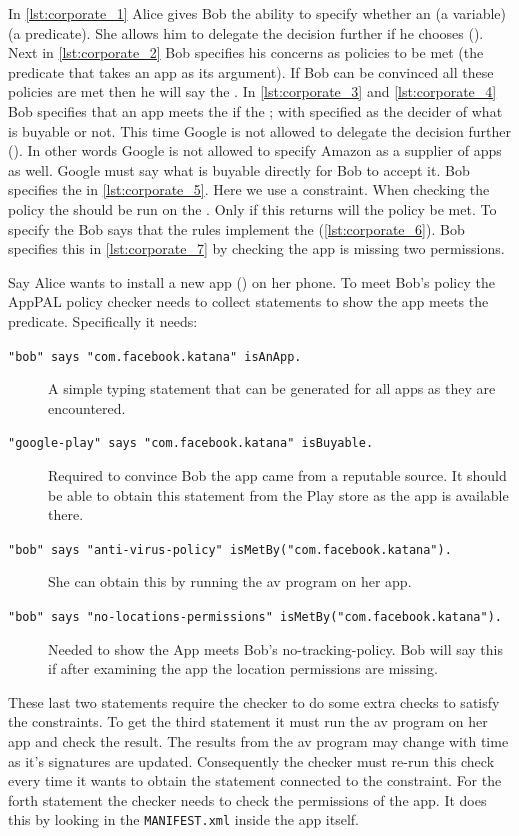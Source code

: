 \documentclass[a4paper]{scrartcl}
\begin{document}
In \autoref{lst:corporate_1} Alice gives Bob the ability to specify whether an  (a variable)  (a predicate).
She allows him to delegate the decision further if he chooses ().
Next in \autoref{lst:corporate_2} Bob specifies his concerns as policies to be met (the  predicate that takes an app as its argument).
If Bob can be convinced all these policies are met then he will say the .
In \autoref{lst:corporate_3} and \autoref{lst:corporate_4} Bob specifies that an app meets the  if the ;
  with  specified as the decider of what is buyable or not.
This time Google is not allowed to delegate the decision further ().
In other words Google is not allowed to specify Amazon as a supplier of apps as well.
Google must say what is buyable directly for Bob to accept it.
Bob specifies the  in \autoref{lst:corporate_5}.
Here we use a constraint.
When checking the policy the  should be run on the .
Only if this returns  will the policy be met.
To specify the  Bob says that the  rules implement the  (\autoref{lst:corporate_6}).
Bob specifies this in \autoref{lst:corporate_7} by checking the app is missing two permissions.

Say Alice wants to install a new app () on her phone.
To meet Bob's policy the AppPAL policy checker needs to collect statements to show the app meets the  predicate.
Specifically it needs:
\begin{description}
  \item[\texttt{"bob" says "com.facebook.katana" isAnApp.}] 
    A simple typing statement that can be generated for all apps as they are encountered.
  \item[\texttt{"google-play" says "com.facebook.katana" isBuyable.}] 
    Required to convince Bob the app came from a reputable source. 
    It should be able to obtain this statement from the Play store as the app is available there.
  \item[\texttt{"bob" says "anti-virus-policy" isMetBy("com.facebook.katana").}]
    She can obtain this by running the \ac{av} program on her app.
  \item[\texttt{"bob" says "no-locations-permissions" isMetBy("com.facebook.katana").}]
    Needed to show the App meets Bob's no-tracking-policy.
    Bob will say this if after examining the app the location permissions are missing.
\end{description}
These last two statements require the checker to do some extra checks to satisfy the constraints.
To get the third statement it must run the \ac{av} program on her app and check the result.
The results from the \ac{av} program may change with time as it's signatures are updated.  
Consequently the checker must re-run this check every time it wants to obtain the statement connected to the constraint.
For the forth statement the checker needs to check the permissions of the app.
It does this by looking in the \texttt{MANIFEST.xml} inside the app itself.
\end{document}

